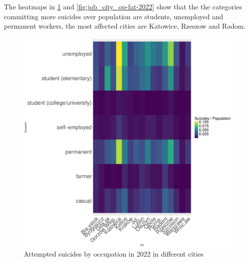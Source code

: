 \documentclass{article}
\begin{document}
The heatmaps in \ref{fig:job_city_op-att-2022} and \ref{fig:job_city_op-fat-2022}
show that the the categories committing more suicides over population are students,
unemployed and permanent workers, the most affected cities are Katowice, Rzeszow and Radom.
\begin{figure}[H]
    \centering
    \begin{minipage}{0.45\textwidth}
        \includegraphics[width=\textwidth]{imgs/job_city_op-att-2022.pdf}
        \caption{Attempted suicides by occupation in 2022 in different cities}
	\label{fig:job_city_op-att-2022}
    \end{minipage}
    \hfill
    \begin{minipage}{0.45\textwidth}

\end{minipage}
\end{figure}
\end{document}
